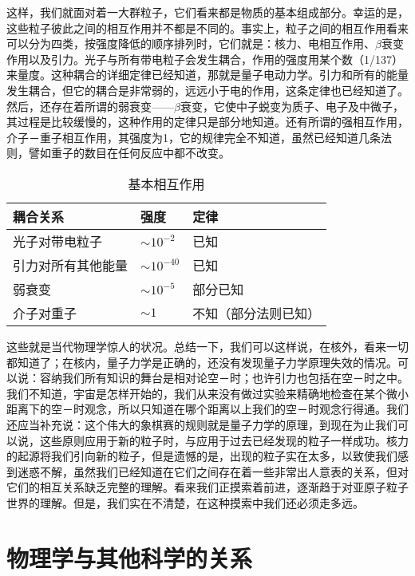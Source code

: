 \documentclass[12pt,oneside]{book}
\begin{document}
\begin{common-format}
这样，我们就面对着一大群粒子，它们看来都是物质的基本组成部分。幸运的是，这些粒子彼此之间的相互作用并不都是不同的。事实上，粒子之间的相互作用看来可以分为四类，按强度降低的顺序排列时，它们就是：核力、电相互作用、$\beta$衰变作用以及引力。光子与所有带电粒子会发生耦合，作用的强度用某个数（1/137）来量度。这种耦合的详细定律已经知道，那就是量子电动力学。引力和所有的能量发生耦合，但它的耦合是非常弱的，远远小于电的作用，这条定律也已经知道了。然后，还存在着所谓的弱衰变——$\beta$衰变，它使中子蜕变为质子、电子及中微子，其过程是比较缓慢的，这种作用的定律只是部分地知道。还有所谓的强相互作用，介子－重子相互作用，其强度为1，它的规律完全不知道，虽然已经知道几条法则，譬如重子的数目在任何反应中都不改变。
\begin{table}[H]
\centering
\label{tab:基本相互作用}
\caption{基本相互作用}
\medskip 
\begin{tabular}{@{}lll@{}}
\toprule
耦合关系      & 强度             & 定律         \\ \midrule
光子对带电粒子   & $\sim10^{-2}$  & 已知         \\
引力对所有其他能量 & $\sim10^{-40}$ & 已知         \\
弱衰变       & $\sim10^{-5}$  & 部分已知       \\
介子对重子     & $\sim1$        & 不知（部分法则已知） \\ \bottomrule
\end{tabular}
\end{table}

这些就是当代物理学惊人的状况。总结一下，我们可以这样说，在核外，看来一切都知道了；在核内，量子力学是正确的，还没有发现量子力学原理失效的情况。可以说：容纳我们所有知识的舞台是相对论空－时；也许引力也包括在空－时之中。我们不知道，宇宙是怎样开始的，我们从来没有做过实验来精确地检查在某个微小距离下的空－时观念，所以只知道在哪个距离以上我们的空－时观念行得通。我们还应当补充说：这个伟大的象棋赛的规则就是量子力学的原理，到现在为止我们可以说，这些原则应用于新的粒子时，与应用于过去已经发现的粒子一样成功。核力的起源将我们引向新的粒子，但是遗憾的是，出现的粒子实在太多，以致使我们感到迷惑不解，虽然我们已经知道在它们之间存在着一些非常出人意表的关系，但对它们的相互关系缺乏完整的理解。看来我们正摸索着前进，逐渐趋于对亚原子粒子世界的理解。但是，我们实在不清楚，在这种摸索中我们还必须走多远。


\chapter{物理学与其他科学的关系}

\end{common-format}
\end{document}
